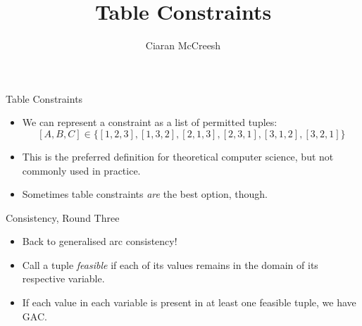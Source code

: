 \documentclass{beamer}
\title{Table Constraints}
\author{Ciaran McCreesh}
\begin{document}
{
    \begin{frame}
        \titlepage
    \end{frame}
}

\begin{frame}{Table Constraints}
    \begin{itemize}
        \item We can represent a constraint as a list of permitted
            tuples: \[ [A, B, C] \in \{ [1, 2, 3], [1, 3, 2], [2, 1, 3], [2, 3,
            1], [3, 1, 2], [3, 2, 1] \} \]
        \item This is the preferred definition for theoretical computer
            science, but not commonly used in practice.
        \item Sometimes table constraints \emph{are} the best option, though.
    \end{itemize}
\end{frame}

\begin{frame}{Consistency, Round Three}
    \begin{itemize}
        \item Back to generalised arc consistency!
        \item Call a tuple \emph{feasible} if each of its values remains in the
            domain of its respective variable.
        \item If each value in each variable is present in at least one
            feasible tuple, we have GAC.
    \end{itemize}
\end{frame}
\end{document}
